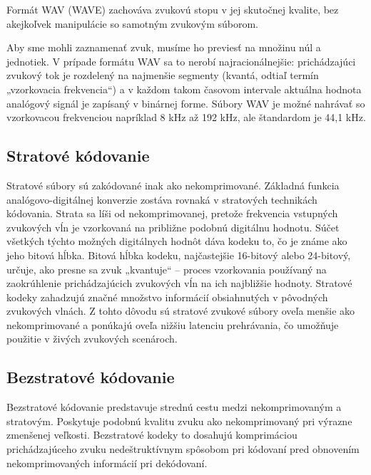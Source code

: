 \documentclass[10pt,twoside,slovak,a4paper]{article}
\begin{document}
Formát WAV (WAVE) zachováva zvukovú stopu v jej skutočnej kvalite, bez akejkoľvek manipulácie so samotným zvukovým súborom.

Aby sme mohli zaznamenať zvuk, musíme ho previesť na množinu núl a jednotiek. V prípade formátu WAV sa to nerobí najracionálnejšie: prichádzajúci zvukový tok je rozdelený na najmenšie segmenty (kvantá, odtiaľ termín „vzorkovacia frekvencia“) a v každom takom časovom intervale aktuálna hodnota analógový signál je zapísaný v binárnej forme. Súbory WAV je možné nahrávať so vzorkovacou frekvenciou napríklad 8 kHz až 192 kHz, ale štandardom je 44,1 kHz.

\subsection{Stratové kódovanie} \label{strat}

Stratové súbory sú zakódované inak ako nekomprimované. Základná funkcia analógovo-digitálnej konverzie zostáva rovnaká v stratových technikách kódovania. Strata sa líši od nekomprimovanej, pretože frekvencia vstupných zvukových vĺn je vzorkovaná na približne podobnú digitálnu hodnotu. Súčet všetkých týchto možných digitálnych hodnôt dáva kodeku to, čo je známe ako jeho bitová hĺbka. Bitová hĺbka kodeku, najčastejšie 16-bitový alebo 24-bitový, určuje, ako presne sa zvuk „kvantuje“ – proces vzorkovania používaný na zaokrúhlenie prichádzajúcich zvukových vĺn na ich najbližšie hodnoty. Stratové kodeky zahadzujú značné množstvo informácií obsiahnutých v pôvodných zvukových vlnách. Z tohto dôvodu sú stratové zvukové súbory oveľa menšie ako nekomprimované a ponúkajú oveľa nižšiu latenciu prehrávania, čo umožňuje použitie v živých zvukových scenároch.

\subsection{Bezstratové kódovanie}\label{bezstrat}

Bezstratové kódovanie predstavuje strednú cestu medzi nekomprimovaným a stratovým. Poskytuje podobnú kvalitu zvuku ako nekomprimovaný pri výrazne zmenšenej veľkosti. Bezstratové kodeky to dosahujú komprimáciou prichádzajúceho zvuku nedeštruktívnym spôsobom pri kódovaní pred obnovením nekomprimovaných informácií pri dekódovaní.
\end{document}
